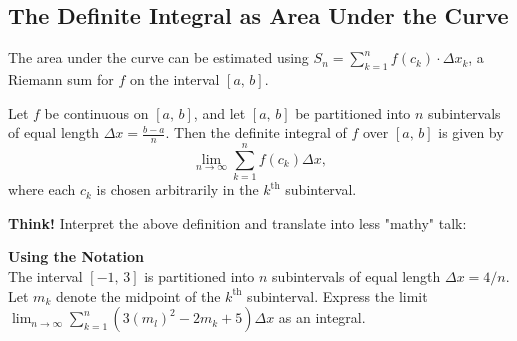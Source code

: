 \subsection*{The Definite Integral as Area Under the Curve}

\begin{center}
\end{center}

The area under the curve can be estimated using $\displaystyle S_n=\sum_{k=1}^n f\left(c_k\right)\cdot\Delta x_k$, a Riemann sum for $f$ on the interval $[a,\,b].$

\begin{tcolorbox}[title= LIMIT DEFINITION OF THE DEFINITE INTEGRAL,colframe=black,sharp corners,colback=white,colbacktitle=white,coltitle=black,boxrule=1pt]

     Let $f$ be continuous on $[a,\,b]$, and let $[a,\,b]$ be partitioned into $n$ subintervals of equal length $\displaystyle \Delta x=\frac{b-a}{n}$. Then the definite integral of $f$ over $[a,\,b]$ is given by
     \[\lim_{n\to\infty}\sum_{k=1}^n f\left(c_k\right)\Delta x,\]
     where each $c_k$ is chosen arbitrarily in the $k^{\text{th}}$ subinterval.
    
\end{tcolorbox}

\noindent\textbf{Think!} Interpret the above definition and translate into less "mathy" talk:


\textbf{Using the Notation}\\
The interval $[-1,\,3]$ is partitioned into $n$ subintervals of equal length $\Delta x=4/n$. Let $m_k$ denote the midpoint of the $k^{\text{th}}$ subinterval. Express the limit $\displaystyle\lim_{n\to\infty}\sum_{k=1}^n \left( 3\left(m_l\right)^2-2m_k +5 \right)\Delta x$ as an integral.

\newpage

